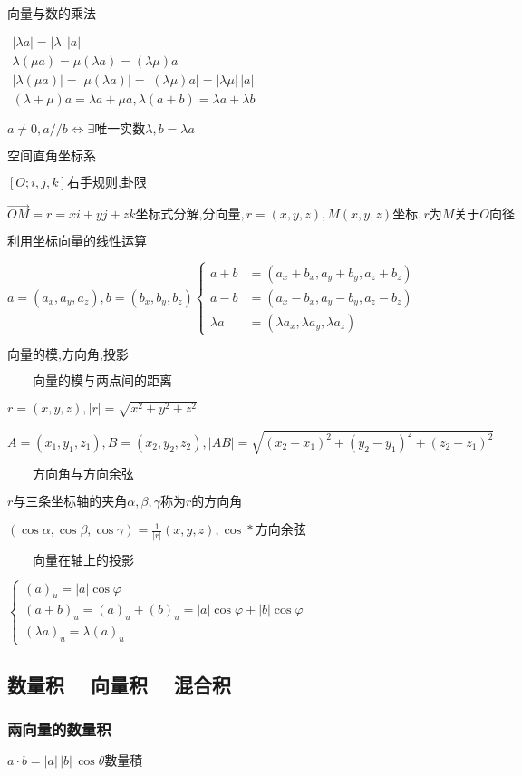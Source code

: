 \documentclass[UTF8]{ctexart}
\newcommand{\mt}[1]{\text{#1}}
\newcommand{\mb}[1]{\textbf{#1}}
\newcommand{\mf}[1]{\left( #1\right)}
\newcommand{\mfa}[1]{\left| #1\right|}
\newcommand{\mfc}[1]{\left[ #1 \right]}
\newcommand{\q}{\quad}
\newcommand{\mha}[1]{\overrightarrow{#1}}
\newcommand{\p}{\par}
\newcommand{\ma}[1]{\begin{array}{llll} #1 \end{array}}
\begin{document}
$\mb{向量与数的乘法}$\p
$\ma{
    \mfa{\lambda a}=\mfa{\lambda }\,\mfa{a}\\
    \lambda \mf{\mu a}= \mu \mf{ \lambda a}=\mf{\lambda \mu} a\\
    \mfa{\lambda \mf{\mu a}}= \mfa{\mu \mf{ \lambda a}}=\mfa{\mf{\lambda \mu} a}= \mfa{\lambda \mu} \,\mfa{a}\\
    \mf{\lambda+\mu}a= \lambda  a +  \mu a,\lambda\mf{a+b}=\lambda a+\lambda b
}$\p

$a \neq 0,a // b \Leftrightarrow \exists \mt{唯一实数}\lambda,b=\lambda a$\p

$\mb{空间直角坐标系}$\p
$\mfc{O;i,j,k}\mt{右手规则,卦限}$\p
$\mha{OM}=r=xi+yj+zk\mt{坐标式分解,分向量},r=\mf{x,y,z},M\mf{x,y,z}\mt{坐标},r \mt{为} M \mt{关于}O\mt{向径}$\p

$\mb{利用坐标向量的线性运算}$\p

$a=\mf{a_x,a_y,a_z},b=\mf{b_x,b_y,b_z}\left\{\ma{
    a+b & =\mf{a_x+b_x,a_y+b_y,a_z+b_z}\\
    a-b & =\mf{a_x-b_x,a_y-b_y,a_z-b_z}\\
    \lambda a & =\mf{\lambda a_x,\lambda a_y,\lambda a_z}
}\right.$

$\mb{向量的模,方向角,投影}$\p

$\q\q \mb{向量的模与两点间的距离}$\p
$r=\mf{x,y,z},\mfa{r}=\sqrt{x^2+ y^2+ z^2}$\p
$A=\mf{x_1 ,y_1, z_1},B=\mf{x_2, y_2, z_2},\mfa{AB}=\sqrt{\mf{x_2-x_1}^2+\mf{y_2-y_1}^2+\mf{z_2-z_1}^2 }$\p

$\q\q \mb{方向角与方向余弦}$\p
$r\mt{与三条坐标轴的夹角} \alpha, \beta, \gamma \mt{称为} r \mt{的方向角}$\p
$\mf{\cos \alpha ,\cos \beta,\cos \gamma}=\frac{1}{\mfa{r}}\mf{x,y,z},\cos * \mt{方向余弦}$

$\q\q \mb{向量在轴上的投影}$\p
$\left\{\ma{
    \mf{a}_u=\mfa{a}\cos \varphi\\
    \mf{a+b}_u=\mf{a}_u+\mf{b}_u=\mfa{a}\cos \varphi+\mfa{b}\cos \varphi\\
    \mf{\lambda a}_u=\lambda \mf{a}_u
}\right.$


\subsection{数量积 $\q$向量积$\q$ 混合积}

\subsubsection{兩向量的数量积}

$a \cdot b=\mfa{a}\,\mfa{b}\,\cos \theta \mt{數量積}$\p
\end{document}
